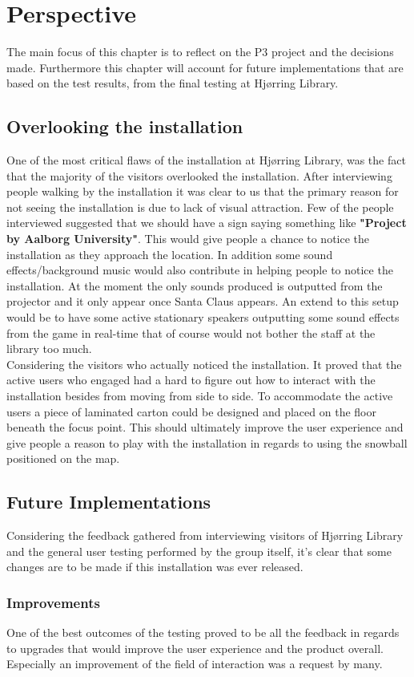 \chapter{Perspective}
The main focus of this chapter is to reflect on the P3 project and the decisions made. Furthermore this chapter will account for future implementations that are based on the test results, from the final testing at Hj{\o}rring Library.
\section{Overlooking the installation}
One of the most critical flaws of the installation at Hj{\o}rring Library, was the fact that the majority of the visitors overlooked the installation. After interviewing people walking by the installation it was clear to us that the primary reason for not seeing the installation is due to lack of visual attraction. Few of the people interviewed suggested that we should have a sign saying something like \textbf{"Project by Aalborg University"}. This would give people a chance to notice the installation as they approach the location. In addition some sound effects/background music would also contribute in helping people to notice the installation. At the moment the only sounds produced is outputted from the projector and it only appear once Santa Claus appears. An extend to this setup would be to have some active stationary speakers outputting some sound effects from the game in real-time that of course would not bother the staff at the library too much.\\
Considering the visitors who actually noticed the installation. It proved that the active users who engaged had a hard to figure out how to interact with the installation besides from moving from side to side. To accommodate the active users a piece of laminated carton could be designed and placed on the floor beneath the focus point. This should ultimately improve the user experience and give people a reason to play with the installation in regards to using the snowball positioned on the map.\\
\section{Future Implementations}
Considering the feedback gathered from interviewing visitors of Hj{\o}rring Library and the general user testing performed by the group itself, it's clear that some changes are to be made if this installation was ever released.
\subsection{Improvements}
One of the best outcomes of the testing proved to be all the feedback in regards to upgrades that would improve the user experience and the product overall. Especially an improvement of the field of interaction was a request by many.  
